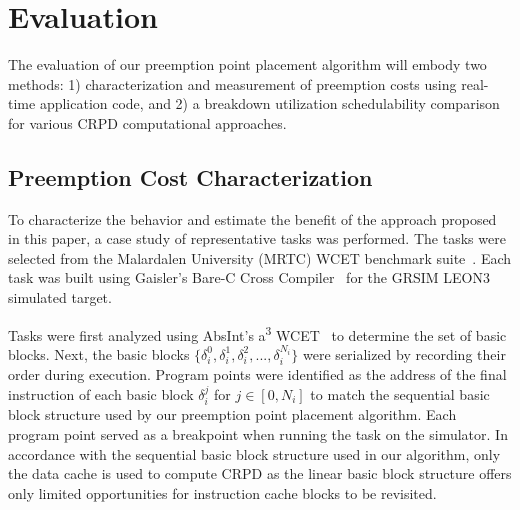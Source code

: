 \vspace{-10pt}
\section{Evaluation}\label{sec:evaluation}
The evaluation of our preemption point placement algorithm will embody
two methods: 1) characterization and measurement of preemption costs
using real-time application code, and 2) a breakdown utilization schedulability
comparison for various CRPD computational approaches.
\subsection {Preemption Cost
  Characterization}\label{sec:preemption_cost_measurement}
To characterize the behavior and estimate the benefit of the approach
proposed in this paper, a case study of representative tasks was
performed. The tasks were selected from the Malardalen University (MRTC) WCET benchmark suite~\cite{mrtc:01}. Each task was built using Gaisler's Bare-C Cross Compiler~\cite{gaisler:01} for the GRSIM LEON3~\cite{gaisler:02} simulated target.
%

Tasks were first analyzed using AbsInt's a\textsuperscript{3} WCET~\cite{absint:01}
to determine the set of basic blocks. Next, the basic blocks ${\{\delta_i^0, \delta_i^1, \delta_i^2, ..., \delta_i^{N_i}\}}$ were serialized by recording their order during execution. Program points were identified as the address of the final instruction of each basic block ${\delta_i^j}$ for $j \in [0, N_i]$ to match the sequential basic block structure used by our preemption point placement algorithm. Each program point served as a breakpoint when running the task on the simulator. In accordance with the sequential basic block structure used in our algorithm, only the data cache is used to compute CRPD as the linear basic block structure offers only limited opportunities for instruction cache blocks to be revisited.

